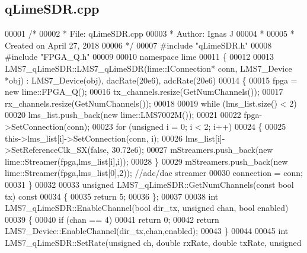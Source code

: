 \subsection{q\+Lime\+S\+D\+R.\+cpp}
\label{qLimeSDR_8cpp_source}

\begin{DoxyCode}
00001 \textcolor{comment}{/*}
00002 \textcolor{comment}{ * File:   qLimeSDR.cpp}
00003 \textcolor{comment}{ * Author: Ignas J}
00004 \textcolor{comment}{ *}
00005 \textcolor{comment}{ * Created on April 27, 2018}
00006 \textcolor{comment}{ */}
00007 \textcolor{preprocessor}{#include "qLimeSDR.h"}
00008 \textcolor{preprocessor}{#include "FPGA_Q.h"}
00009 
00010 \textcolor{keyword}{namespace }lime
00011 \{
00012 
00013 LMS7_qLimeSDR::LMS7_qLimeSDR(lime::IConnection* conn, LMS7_Device *obj) : 
      LMS7_Device(obj), dacRate(20e6), adcRate(20e6)
00014 \{
00015     fpga = \textcolor{keyword}{new} lime::FPGA_Q();
00016     tx_channels.resize(GetNumChannels());
00017     rx_channels.resize(GetNumChannels());
00018   
00019     \textcolor{keywordflow}{while} (lms_list.size() < 2)
00020         lms_list.push\_back(\textcolor{keyword}{new} lime::LMS7002M());
00021 
00022     fpga->SetConnection(conn);
00023     \textcolor{keywordflow}{for} (\textcolor{keywordtype}{unsigned} i = 0; i < 2; i++)
00024     \{
00025         this->lms_list[i]->SetConnection(conn, i);
00026         lms_list[i]->SetReferenceClk\_SX(\textcolor{keyword}{false}, 30.72e6);
00027         mStreamers.push\_back(\textcolor{keyword}{new} lime::Streamer(fpga,lms_list[i],i));
00028     \}       
00029     mStreamers.push\_back(\textcolor{keyword}{new} lime::Streamer(fpga,lms_list[0],2)); \textcolor{comment}{//adc/dac streamer}
00030     connection = conn;
00031 \}
00032 
00033 \textcolor{keywordtype}{unsigned} LMS7_qLimeSDR::GetNumChannels(\textcolor{keyword}{const} \textcolor{keywordtype}{bool} tx)\textcolor{keyword}{ const}
00034 \textcolor{keyword}{}\{
00035     \textcolor{keywordflow}{return} 5;
00036 \};
00037 
00038 \textcolor{keywordtype}{int} LMS7_qLimeSDR::EnableChannel(\textcolor{keywordtype}{bool} dir_tx, \textcolor{keywordtype}{unsigned} chan, \textcolor{keywordtype}{bool} enabled)
00039 \{
00040     \textcolor{keywordflow}{if} (chan == 4)
00041         \textcolor{keywordflow}{return} 0;
00042     \textcolor{keywordflow}{return} LMS7_Device::EnableChannel(dir\_tx,chan,enabled);
00043 \}
00044 
00045 \textcolor{keywordtype}{int} LMS7_qLimeSDR::SetRate(\textcolor{keywordtype}{unsigned} ch, \textcolor{keywordtype}{double} rxRate, \textcolor{keywordtype}{double} txRate, \textcolor{keywordtype}{unsigned} 

\end{DoxyCode}
